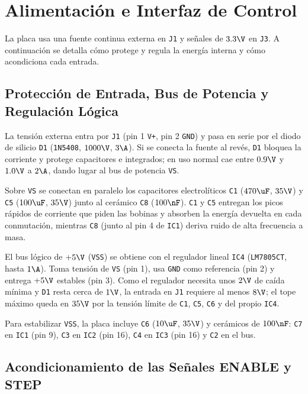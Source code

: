 \chapter{Alimentación e Interfaz de Control}
\label{sec:alimentacion_interfaz}

La placa usa una fuente continua externa en \texttt{J1} y señales de $3.3\V$ en \texttt{J3}. A continuación se
detalla cómo protege y regula la energía interna y cómo acondiciona cada entrada.

\section{Protección de Entrada, Bus de Potencia y Regulación Lógica}
\label{sec:alimentacion_regulacion}

La tensión externa entra por \texttt{J1} (pin 1 \texttt{V+}, pin 2 \texttt{GND}) y pasa en serie por el diodo de
silicio \texttt{D1} (\texttt{1N5408}, $1000\V$, $3\A$). Si se conecta la fuente al revés, \texttt{D1} bloquea la
corriente y protege capacitores e integrados; en uso normal cae entre $0.9\V$ y $1.0\V$ a $2\A$, dando lugar al
bus de potencia \texttt{VS}.

Sobre \texttt{VS} se conectan en paralelo los capacitores electrolíticos \texttt{C1} ($470\uF$, $35\V$) y
\texttt{C5} ($100\uF$, $35\V$) junto al cerámico \texttt{C8} ($100\nF$). \texttt{C1} y \texttt{C5} entregan los
picos rápidos de corriente que piden las bobinas y absorben la energía devuelta en cada conmutación, mientras
\texttt{C8} (junto al pin 4 de \texttt{IC1}) deriva ruido de alta frecuencia a masa.

El bus lógico de $+5\V$ (\texttt{VSS}) se obtiene con el regulador lineal \texttt{IC4} (\texttt{LM7805CT}, hasta
$1\A$). Toma tensión de \texttt{VS} (pin 1), usa \texttt{GND} como referencia (pin 2) y entrega $+5\V$ estables
(pin 3). Como el regulador necesita unos $2\V$ de caída mínima y \texttt{D1} resta cerca de $1\V$, la entrada en
\texttt{J1} requiere al menos $8\V$; el tope máximo queda en $35\V$ por la tensión límite de \texttt{C1},
\texttt{C5}, \texttt{C6} y del propio \texttt{IC4}.

Para estabilizar \texttt{VSS}, la placa incluye \texttt{C6} ($10\uF$, $35\V$) y cerámicos de $100\nF$:
\texttt{C7} en \texttt{IC1} (pin 9), \texttt{C3} en \texttt{IC2} (pin 16), \texttt{C4} en \texttt{IC3} (pin 16)
y \texttt{C2} en el bus.

\section{Acondicionamiento de las Señales ENABLE y STEP}
\label{sec:enable_step}

